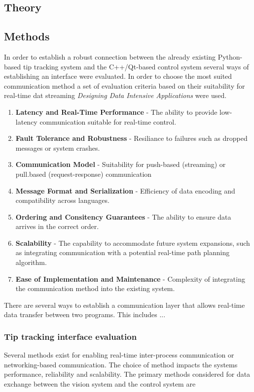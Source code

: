 
\subsection{Theory}


\subsection{Methods}
In order to establish a robust connection between the already existing Python-based tip tracking system and the C++/Qt-based control system several ways of establishing an interface were evaluated. In order to choose the most suited communication method a set of evaluation criteria based on their suitability for real-time dat streaming \textit{Designing Data Intensive Applications} \cite{kleppmann_designing_2017} were used.

\begin{enumerate}
    \item \textbf{Latency and Real-Time Performance} - The ability to provide low-latency communication suitable for real-time control.
    \item \textbf{Fault Tolerance and Robustness} - Resiliance to failures such as dropped messages or system crashes.
    \item \textbf{Communication Model} - Suitability for push-based (streaming) or pull.based (request-response) communication
    \item \textbf{Message Format and Serialization} - Efficiency of data encoding and compatibility across languages.
    \item \textbf{Ordering and Consitency Guarantees} - The ability to ensure data arrives in the correct order.
    \item \textbf{Scalability} - The capability to accommodate future system expansions, such as integrating communication with a potential real-time path planning algorithm.
    \item \textbf{Ease of Implementation and Maintenance} - Complexity of integrating the communication method into the existing system.
\end{enumerate}

There are several ways to establish a communication layer that allows real-time data transfer between two programs. This includes ...


\subsubsection{Tip tracking interface evaluation}
Several methods exist for enabling real-time inter-process communication or networking-based communication. The choice of method impacts the systems performance, reliability and scalability. The primary methods considered for data exchange between the vision system and the control system are

